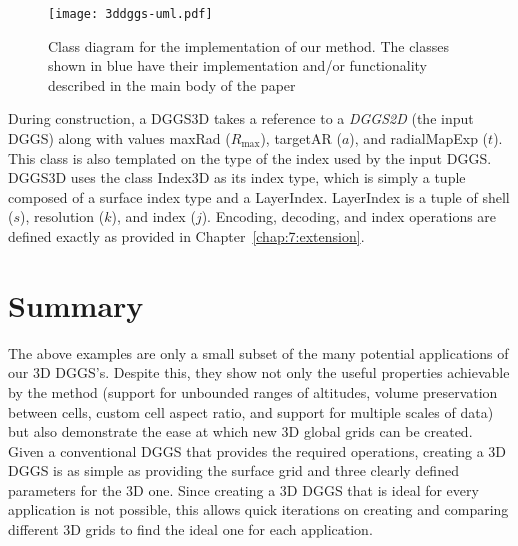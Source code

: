 \begin{figure}[ht!]
	\centering
	\texttt{[image: 3ddggs-uml.pdf]}
	\caption[Title]{
		Class diagram for the implementation of our method. The classes shown in blue have their implementation and/or functionality described in the main body of the paper
	}
	\label{fig:uml}
\end{figure}


During construction, a DGGS3D takes a reference to a \textit{DGGS2D} (the input DGGS) along with values maxRad ($R_\mathrm{max}$), targetAR ($a$), and radialMapExp ($t$). This class is also templated on the type of the index used by the input DGGS. DGGS3D uses the class Index3D as its index type, which is simply a tuple composed of a surface index type and a LayerIndex. LayerIndex is a tuple of shell ($s$), resolution ($k$), and index ($j$).
Encoding, decoding, and index operations are defined exactly as provided in Chapter~\ref{chap:7:extension}.





\section{Summary}
The above examples are only a small subset of the many potential applications of our 3D DGGS's.
Despite this, they show not only the useful properties achievable by the method (support for unbounded ranges of altitudes, volume preservation between cells, custom cell aspect ratio, and support for multiple scales of data) but also demonstrate the ease at which new 3D global grids can be created.
Given a conventional DGGS that provides the required operations, creating a 3D DGGS is as simple as providing the surface grid and three clearly defined parameters for the 3D one.
Since creating a 3D DGGS that is ideal for every application is not possible, this allows quick iterations on creating and comparing different 3D grids to find the ideal one for each application.

